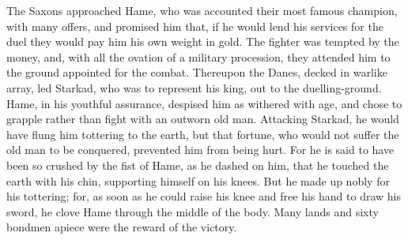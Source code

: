 \documentclass[10pt,a4paper]{report}
\begin{document}
The Saxons approached Hame, who was accounted their most famous champion, with many offers, and promised him that, if he would lend his services for the duel they would pay him his own weight in gold. The fighter was tempted by the money, and, with all the ovation of a military procession, they attended him to the ground appointed for the combat. Thereupon the Danes, decked in warlike array, led Starkad, who was to represent his king, out to the duelling-ground. Hame, in his youthful assurance, despised him as withered with age, and chose to grapple rather than fight with an outworn old man. Attacking Starkad, he would have flung him tottering to the earth, but that fortune, who would not suffer the old man to be conquered, prevented him from being hurt. For he is said to have been so crushed by the fist of Hame, as he dashed on him, that he touched the earth with his chin, supporting himself on his knees. But he made up nobly for his tottering; for, as soon as he could raise his knee and free his hand to draw his sword, he clove Hame through the middle of the body. Many lands and sixty bondmen apiece were the reward of the victory.\\
\end{document}
